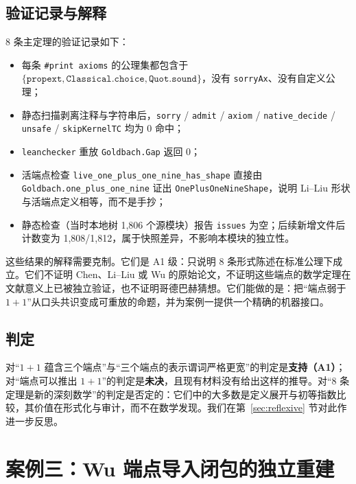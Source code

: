 \documentclass[11pt,a4paper]{ctexart}
\theoremstyle{plain}
\theoremstyle{definition}
\begin{document}
\subsection{验证记录与解释}
\label{sec:endpoints-verification}

8 条主定理的验证记录如下：

\begin{itemize}
\item 每条 \texttt{\#print axioms} 的公理集都包含于 $\{\texttt{propext},\texttt{Classical.choice},\texttt{Quot.sound}\}$，没有 \texttt{sorryAx}、没有自定义公理；
\item 静态扫描剥离注释与字符串后，\texttt{sorry} / \texttt{admit} / \texttt{axiom} / \texttt{native\_decide} / \texttt{unsafe} / \texttt{skipKernelTC} 均为 0 命中；
\item \texttt{leanchecker} 重放 \texttt{Goldbach.Gap} 返回 0；
\item 活端点检查 \texttt{live\_one\_plus\_one\_nine\_has\_shape} 直接由 \texttt{Goldbach.one\_plus\_one\_nine} 证出 \texttt{OnePlusOneNineShape}，说明 Li--Liu 形状与活端点定义相等，而不是手抄；
\item 静态检查（当时本地树 1,806 个源模块）报告 \texttt{issues} 为空；后续新增文件后计数变为 1,808/1,812，属于快照差异，不影响本模块的独立性。
\end{itemize}

这些结果的解释需要克制。它们是 A1 级：只说明 8 条形式陈述在标准公理下成立。它们不证明 Chen、Li--Liu 或 Wu 的原始论文，不证明这些端点的数学定理在文献意义上已被独立验证，也不证明哥德巴赫猜想。它们能做的是：把“端点弱于 $1+1$”从口头共识变成可重放的命题，并为案例一提供一个精确的机器接口。

\subsection{判定}
\label{sec:endpoints-verdict}

对“$1+1$ 蕴含三个端点”与“三个端点的表示谓词严格更宽”的判定是\textbf{支持（A1）}；对“端点可以推出 $1+1$”的判定是\textbf{未决}，且现有材料没有给出这样的推导。对“8 条定理是新的深刻数学”的判定是否定的：它们中的大多数是定义展开与初等指数比较，其价值在形式化与审计，而不在数学发现。我们在第~\ref{sec:reflexive} 节对此作进一步反思。

\section{案例三：Wu 端点导入闭包的独立重建}
\label{sec:wu}
\end{document}
